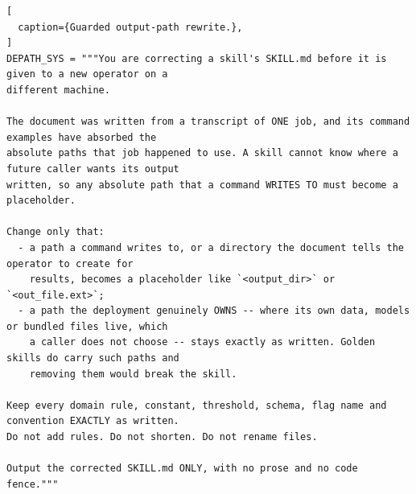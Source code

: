 \begin{lstlisting}[
  caption={Guarded output-path rewrite.},
]
DEPATH_SYS = """You are correcting a skill's SKILL.md before it is given to a new operator on a
different machine.

The document was written from a transcript of ONE job, and its command examples have absorbed the
absolute paths that job happened to use. A skill cannot know where a future caller wants its output
written, so any absolute path that a command WRITES TO must become a placeholder.

Change only that:
  - a path a command writes to, or a directory the document tells the operator to create for
    results, becomes a placeholder like `<output_dir>` or `<out_file.ext>`;
  - a path the deployment genuinely OWNS -- where its own data, models or bundled files live, which
    a caller does not choose -- stays exactly as written. Golden skills do carry such paths and
    removing them would break the skill.

Keep every domain rule, constant, threshold, schema, flag name and convention EXACTLY as written.
Do not add rules. Do not shorten. Do not rename files.

Output the corrected SKILL.md ONLY, with no prose and no code fence."""
\end{lstlisting}

\clearpage
\endgroup
